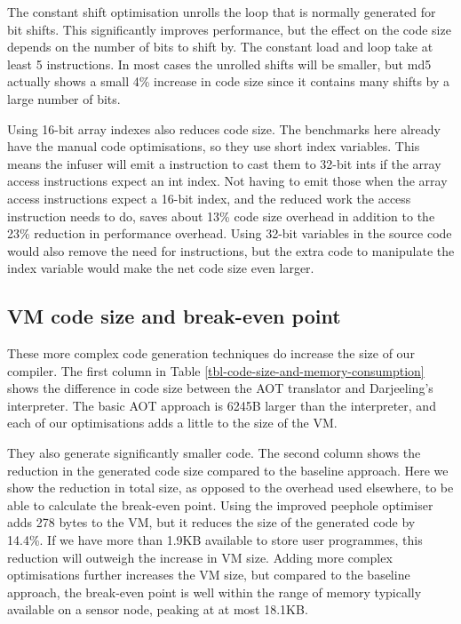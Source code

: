 The constant shift optimisation unrolls the loop that is normally generated for bit shifts. This significantly improves performance, but the effect on the code size depends on the number of bits to shift by. The constant load and loop take at least 5 instructions. In most cases the unrolled shifts will be smaller, but md5 actually shows a small 4\% increase in code size since it contains many shifts by a large number of bits.

Using 16-bit array indexes also reduces code size. The benchmarks here already have the manual code optimisations, so they use short index variables. This means the infuser will emit a  instruction to cast them to 32-bit ints if the array access instructions expect an int index. Not having to emit those when the array access instructions expect a 16-bit index, and the reduced work the access instruction needs to do, saves about 13\% code size overhead in addition to the 23\% reduction in performance overhead. Using 32-bit variables in the source code would also remove the need for  instructions, but the extra code to manipulate the index variable would make the net code size even larger.

\subsection{VM code size and break-even point}
These more complex code generation techniques do increase the size of our compiler. The first column in Table \ref{tbl-code-size-and-memory-consumption} shows the difference in code size between the AOT translator and Darjeeling's interpreter. The basic AOT approach is 6245B larger than the interpreter, and each of our optimisations adds a little to the size of the VM.

They also generate significantly smaller code. The second column shows the reduction in the generated code size compared to the baseline approach. Here we show the reduction in total size, as opposed to the overhead used elsewhere, to be able to calculate the break-even point. Using the improved peephole optimiser adds 278 bytes to the VM, but it reduces the size of the generated code by 14.4\%. If we have more than 1.9KB available to store user programmes, this reduction will outweigh the increase in VM size. Adding more complex optimisations further increases the VM size, but compared to the baseline approach, the break-even point is well within the range of memory typically available on a sensor node, peaking at at most 18.1KB.


